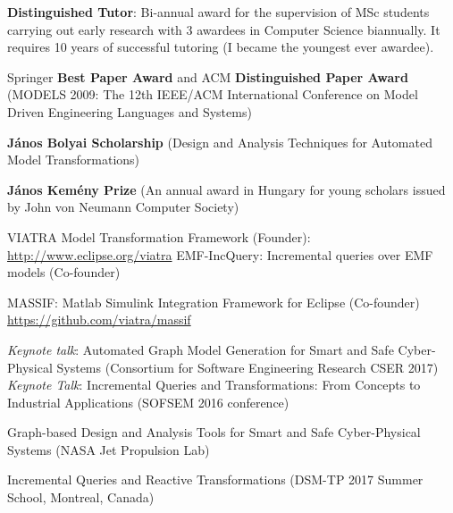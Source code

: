 \documentclass{xetexCV}
\begin{document}
\textbf{Distinguished Tutor}:  Bi-annual award for the supervision
of MSc students carrying out early research with 3 awardees in Computer
Science biannually. It requires 10 years of successful tutoring (I
became the youngest ever awardee). 

Springer \textbf{Best Paper Award} and ACM \textbf{Distinguished Paper Award} \newline (MODELS
2009: The 12th IEEE/ACM International Conference on Model Driven Engineering Languages and
Systems) 

\textbf{J\'anos Bolyai Scholarship}  (Design and Analysis Techniques
for Automated Model Transformations) 

\textbf{J\'anos Kem\'eny Prize } (An annual
award in Hungary for young scholars issued by John von Neumann Computer Society)


VIATRA  Model Transformation Framework (Founder): \newline
\url{http://www.eclipse.org/viatra} 
EMF-IncQuery:  Incremental queries over EMF models (Co-founder) 

MASSIF:  Matlab Simulink Integration Framework for Eclipse (Co-founder) \newline 
\url{https://github.com/viatra/massif} 



\emph{Keynote talk}: Automated  Graph Model Generation for Smart and Safe Cyber-Physical Systems (Consortium for Software Engineering Research CSER 2017) \\

\emph{Keynote Talk}:  Incremental Queries and Transformations: From Concepts to Industrial Applications  (SOFSEM 2016 conference) 

Graph-based  Design and Analysis Tools for Smart and Safe Cyber-Physical Systems (NASA Jet Propulsion Lab) 

Incremental Queries and Reactive Transformations (DSM-TP 2017 Summer School, Montreal, Canada)
\end{document}
